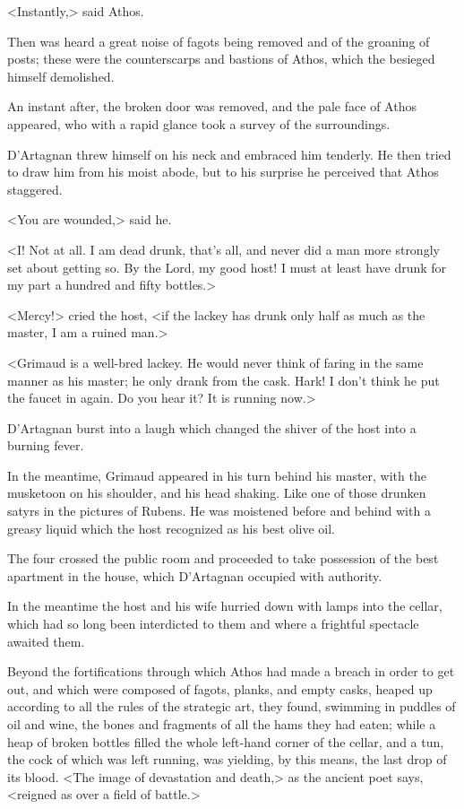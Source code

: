 <Instantly,> said Athos. 

Then was heard a great noise of fagots being removed and of the groaning of posts; these were the counterscarps and bastions of Athos, which the besieged himself demolished. 

An instant after, the broken door was removed, and the pale face of Athos appeared, who with a rapid glance took a survey of the surroundings. 

D'Artagnan threw himself on his neck and embraced him tenderly. He then tried to draw him from his moist abode, but to his surprise he perceived that Athos staggered. 

<You are wounded,> said he. 

<I! Not at all. I am dead drunk, that's all, and never did a man more strongly set about getting so. By the Lord, my good host! I must at least have drunk for my part a hundred and fifty bottles.> 

<Mercy!> cried the host, <if the lackey has drunk only half as much as the master, I am a ruined man.> 

<Grimaud is a well-bred lackey. He would never think of faring in the same manner as his master; he only drank from the cask. Hark! I don't think he put the faucet in again. Do you hear it? It is running now.> 

D'Artagnan burst into a laugh which changed the shiver of the host into a burning fever. 

In the meantime, Grimaud appeared in his turn behind his master, with the musketoon on his shoulder, and his head shaking. Like one of those drunken satyrs in the pictures of Rubens. He was moistened before and behind with a greasy liquid which the host recognized as his best olive oil. 

The four crossed the public room and proceeded to take possession of the best apartment in the house, which D'Artagnan occupied with authority. 

In the meantime the host and his wife hurried down with lamps into the cellar, which had so long been interdicted to them and where a frightful spectacle awaited them. 

Beyond the fortifications through which Athos had made a breach in order to get out, and which were composed of fagots, planks, and empty casks, heaped up according to all the rules of the strategic art, they found, swimming in puddles of oil and wine, the bones and fragments of all the hams they had eaten; while a heap of broken bottles filled the whole left-hand corner of the cellar, and a tun, the cock of which was left running, was yielding, by this means, the last drop of its blood. <The image of devastation and death,> as the ancient poet says, <reigned as over a field of battle.> 

